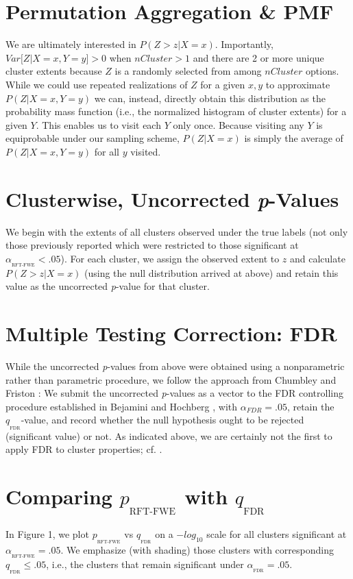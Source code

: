 \documentclass{article}
\newcommand{\subtext}[2]{
#1_{_{\text{#2}}}
}
\begin{document}
\section{Permutation Aggregation \& PMF}
We are ultimately interested in $P(Z>z|X=x)$. Importantly, $Var \big[ Z|X=x,Y=y \big] > 0$  when $nCluster>1$ and there are 2 or more unique cluster extents because $Z$ is a randomly selected from among $nCluster$ options.
While we could use repeated realizations of $Z$ for a given $x,y$ to approximate $P(Z|X=x,Y=y)$ we can, instead, directly obtain this distribution as the probability mass function (i.e., the normalized histogram of cluster extents) for a given $Y$. This enables us to visit each $Y$ only once. Because visiting any $Y$ is equiprobable under our sampling scheme, $P(Z|X=x)$ is simply the average of $P(Z|X=x,Y=y)$ for all $y$ visited.

\section{Clusterwise, Uncorrected \textit{p}-Values}

We begin with the extents of all clusters observed under the true labels (not only those previously reported which were restricted to those significant at $\subtext{\alpha}{RFT-FWE}<.05$). 
For each cluster, we assign the observed extent to $z$ and calculate $P(Z>z|X=x)$ (using the null distribution arrived at above) and retain this value as the uncorrected \textit{p}-value for that cluster.

\section{Multiple Testing Correction: FDR}

While the uncorrected \textit{p}-values from above were obtained using a nonparametric rather than parametric procedure, we follow the approach from Chumbley and Friston \cite{chumbley_false_2009}: We submit the uncorrected \textit{p}-values as a vector to the FDR controlling procedure established in Bejamini and Hochberg \cite{benjamini_controlling_1995}, with $\alpha_{FDR}=.05$, retain the $\subtext{q}{FDR}$-value, and record whether the null hypothesis ought to be rejected (significant value) or not. As indicated above, we are certainly not the first to apply FDR to cluster properties; cf. \cite{chumbley_false_2009,heller_cluster-based_2006,chumbley_topological_2010}.

\section{Comparing $\subtext{p}{RFT-FWE}$ with $\subtext{q}{FDR}$}
In Figure 1, we plot $\subtext{p}{RFT-FWE}$ vs $\subtext{q}{FDR}$ on a $-log_{10}$ scale for all clusters significant at $\subtext{\alpha}{RFT-FWE}=.05$.
We emphasize (with shading) those clusters with corresponding $\subtext{q}{FDR}\leq .05$, i.e., the clusters that remain significant under $\subtext{\alpha}{FDR}=.05$. 




\end{document}
